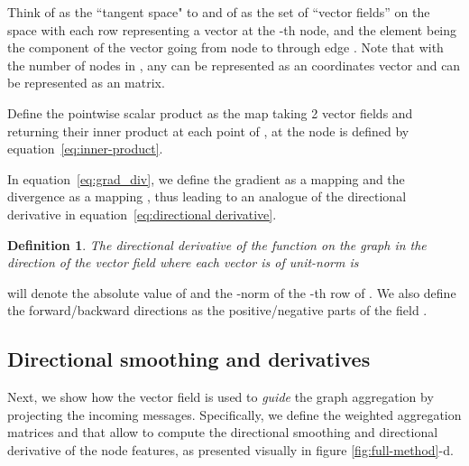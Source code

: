 \documentclass{article} \usepackage{arxiv,times}
\def\eqref#1{equation~\ref{#1}}
\newtheorem{definition}{Definition}
\begin{document}
Think of  as the ``tangent space" to  and of  as the set of ``vector fields'' on the space  with each row  representing a vector at the -th node, and the element  being the component of the vector going from node  to  through edge . Note that with  the number of nodes in , any  can be represented as an  coordinates vector and  can be represented as an  matrix.

Define the pointwise scalar product as the map  taking 2 vector fields and returning their inner product at each point of ,  at the node  is defined by \eqref{eq:inner-product}.



In \eqref{eq:grad_div}, we define the gradient  as a mapping  and the divergence  as a mapping , thus leading to an analogue of the directional derivative in \eqref{eq:directional derivative}.


\begin{definition}
The directional derivative of the function  on the graph  in the direction of the vector field  where each vector is of unit-norm is 

\end{definition}

 will denote the absolute value of  and  the -norm of the -th row of . We also define the forward/backward directions as the positive/negative parts of the field .

\begin{comment}
Let  be a vector field in the graph, meaning that it is an anti-symmetric weighted aggregation matrix,  We define the operators  as the absolute value of  and  as the -norm of the -th row of . The variable  is an arbitrarily small positive real number used to avoid floating-point errors. We also define the forward/backward directions as the positive/negative parts of the field .
\end{comment}

\subsection{Directional smoothing and derivatives}
\label{sec:B_av-B_dx}

Next, we show how the vector field  is used to \textit{guide} the graph aggregation by projecting the incoming messages. Specifically, we define the weighted aggregation matrices  and  that allow to compute the directional smoothing and directional derivative of the node features, as presented visually in figure \ref{fig:full-method}-d.
\end{document}
